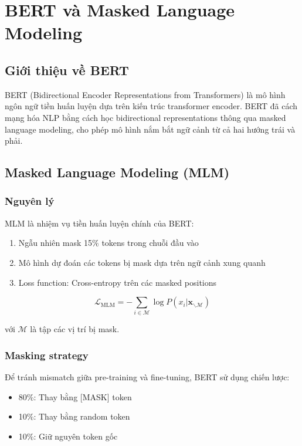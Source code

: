 \section{BERT và Masked Language Modeling}
\label{sec:bert}

\subsection{Giới thiệu về BERT}

BERT (Bidirectional Encoder Representations from Transformers) \cite{devlin2019bert} là mô hình ngôn ngữ tiền huấn luyện dựa trên kiến trúc transformer encoder. BERT đã cách mạng hóa NLP bằng cách học bidirectional representations thông qua masked language modeling, cho phép mô hình nắm bắt ngữ cảnh từ cả hai hướng trái và phải.

\subsection{Masked Language Modeling (MLM)}

\subsubsection{Nguyên lý}

MLM là nhiệm vụ tiền huấn luyện chính của BERT:

\begin{enumerate}
    \item Ngẫu nhiên mask 15\% tokens trong chuỗi đầu vào
    \item Mô hình dự đoán các tokens bị mask dựa trên ngữ cảnh xung quanh
    \item Loss function: Cross-entropy trên các masked positions
\end{enumerate}

\begin{equation}
\mathcal{L}_{\text{MLM}} = -\sum_{i \in \mathcal{M}} \log P(x_i | \mathbf{x}_{\backslash \mathcal{M}})
\end{equation}

với $\mathcal{M}$ là tập các vị trí bị mask.

\subsubsection{Masking strategy}

Để tránh mismatch giữa pre-training và fine-tuning, BERT sử dụng chiến lược:
\begin{itemize}
    \item 80\%: Thay bằng [MASK] token
    \item 10\%: Thay bằng random token
    \item 10\%: Giữ nguyên token gốc
\end{itemize}

